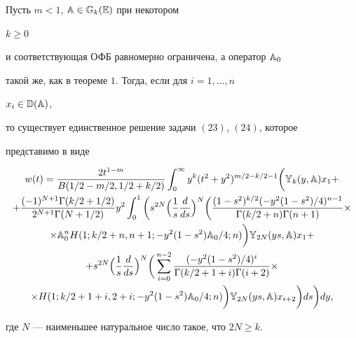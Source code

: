 \begin{thm} Пусть $m<1$, $\Bbb A\in\Bbb G_k(\Bbb E)$ при некотором 


$k\ge 0$ 


и соответствующая ОФБ равномерно ограничена, а оператор $\Bbb A_0$ 


такой же, как в теореме $1$. Тогда, если для $i=1,\dotsc,n$\; 


$x_i\in\Bbb D(\Bbb A)$, 


то существует единственное решение задачи $(23)$, $(24)$, которое 


представимо в виде 


\begin{multline} 


w(t)=\frac{2t^{1-m}}{B(1/2-m/2,1/2+k/2)} 


\int^\infty_0 y^k(t^2+y^2)^{m/2-k/2-1}\bigg(\Bbb Y_k(y,\Bbb A)x_1+ \\


%


+\frac{(-1)^{N+1}\Gamma(k/2+1/2)}{2^{N+1}\Gamma(N+1/2)}y^2


\int^1_0\bigg(s^{2N}\Big(\frac{1}{s}\frac{d}{ds}\Big)^N 


\bigg(\frac{(1-s^2)^{k/2}(-y^2(1-s^2)/4)^{n-1}} 


{\Gamma(k/2+n)\Gamma(n+1)}\times \\


%


\times \Bbb A^n_0 


H(1;k/2+n,n+1;-y^2(1-s^2)\Bbb A_0/4;n)\bigg) 


\Bbb Y_{2N}(ys,\Bbb A)x_1+ \\


%


+s^{2N}\Big(\frac{1}{s}\frac{d}{ds}\Big)^N


\bigg(\sum^{n-2}_{i=0} 


\frac{(-y^2(1-s^2)/4)^i}{\Gamma(k/2+1+i)\Gamma(i+2)} \times \\


%


\times H(1;k/2+1+i,2+i;-y^2(1-s^2)\Bbb A_0/4;n)\bigg) 


\Bbb Y_{2N}(ys,\Bbb A)x_{i+2}\bigg)ds\bigg)dy, 


\end{multline} 


где $N$ --- наименьшее натуральное число такое, что $2N\ge k$. 


\end{thm} 


